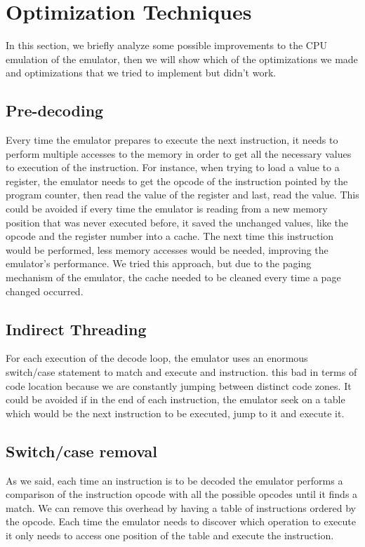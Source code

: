 \section{Optimization Techniques}
In this section, we briefly analyze some possible improvements to the CPU emulation of the emulator, then we will show which of the optimizations we made and optimizations that we tried to implement but didn't work.

\subsection{Pre-decoding}
Every time the emulator prepares to execute the next instruction, it needs to perform multiple accesses to the memory in order to get all the necessary values to execution of the instruction. For instance, when trying to load a value to a register, the emulator needs to get the opcode of the instruction pointed by the program counter, then read the value of the register and last, read the value. This could be avoided if every time the emulator is reading from a new memory position that was never executed before, it saved the unchanged values, like the opcode and the register number into a cache. The next time this instruction would be performed, less memory accesses would be needed, improving the emulator's performance.
We tried this approach, but due to the paging mechanism of the emulator, the cache needed to be cleaned every time a page changed occurred.

\subsection{Indirect Threading}
For each execution of the decode loop, the emulator uses an enormous switch/case statement to match and execute and instruction. this bad in terms of code location because we are constantly jumping between distinct code zones. It could be avoided if in the end of each instruction, the emulator seek on a table which would be the next instruction to be executed, jump to it and execute it.

\subsection{Switch/case removal}
As we said, each time an instruction is to be decoded the emulator performs a comparison of the instruction opcode with all the possible opcodes until it finds a match. We can remove this overhead by having a table of instructions ordered by the opcode. Each time the emulator needs to discover which operation to execute it only needs to access one position of the table and execute the instruction.

